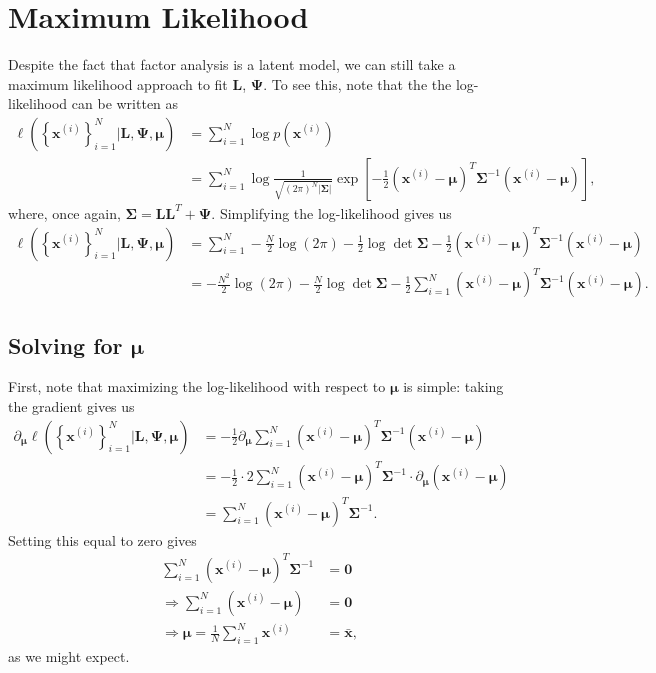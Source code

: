\documentclass[12pt]{article}
\begin{document}
\section{Maximum Likelihood}
Despite the fact that factor analysis is a latent model, we can still take a maximum likelihood approach to fit $\mathbf{L}$, $\boldsymbol{\Psi}$. To see this, note that the the log-likelihood can be written as 
\begin{align}
	\ell \left(\left\{\mathbf{x}^{(i)}\right\}_{i=1}^N|\mathbf{L}, \boldsymbol{\Psi}, \boldsymbol{\mu}\right) &= \sum_{i=1}^N \log p(\mathbf{x}^{(i)}) \\
	&= \sum_{i=1}^N \log \frac{1}{\sqrt{(2\pi)^N |\boldsymbol{\Sigma}|}} \exp\left[-\frac{1}{2} (\mathbf{x}^{(i)} - \boldsymbol{\mu})^T \boldsymbol{\Sigma}^{-1}\left(\mathbf{x}^{(i)} - \boldsymbol{\mu}\right)\right],
\end{align}
where, once again, $\boldsymbol{\Sigma}=\mathbf{LL}^T + \boldsymbol{\Psi}$. Simplifying the log-likelihood gives us
\begin{align}
\ell \left(\left\{\mathbf{x}^{(i)}\right\}_{i=1}^N|\mathbf{L}, \boldsymbol{\Psi}, \boldsymbol{\mu}\right) &= \sum_{i=1}^N -\frac{N}{2}\log(2\pi) -\frac{1}{2} \log\det \boldsymbol{\Sigma} - \frac{1}{2}(\mathbf{x}^{(i)} - \boldsymbol{\mu})^T \boldsymbol{\Sigma}^{-1}\left(\mathbf{x}^{(i)} - \boldsymbol{\mu}\right) \\
&= -\frac{N^2}{2} \log(2\pi) - \frac{N}{2} \log\det\boldsymbol{\Sigma} - \frac{1}{2}\sum_{i=1}^N(\mathbf{x}^{(i)} - \boldsymbol{\mu})^T \boldsymbol{\Sigma}^{-1}\left(\mathbf{x}^{(i)} - \boldsymbol{\mu}\right).
\end{align}
\subsection{Solving for $\boldsymbol{\mu}$}
First, note that maximizing the log-likelihood with respect to $\boldsymbol{\mu}$ is simple: taking the gradient gives us
\begin{align}
\partial_{\boldsymbol{\mu}} \ell \left(\left\{\mathbf{x}^{(i)}\right\}_{i=1}^N|\mathbf{L}, \boldsymbol{\Psi}, \boldsymbol{\mu}\right) &= -\frac{1}{2}\partial_{\boldsymbol{\mu}}  \sum_{i=1}^N(\mathbf{x}^{(i)} - \boldsymbol{\mu})^T \boldsymbol{\Sigma}^{-1}\left(\mathbf{x}^{(i)} - \boldsymbol{\mu}\right) \\
&= -\frac{1}{2} \cdot 2 \sum_{i=1}^N (\mathbf{x}^{(i)} - \boldsymbol{\mu})^T \boldsymbol{\Sigma}^{-1} \cdot \partial_{\boldsymbol{\mu}} (\mathbf{x}^{(i)} - \boldsymbol{\mu}) \\
&= \sum_{i=1}^N (\mathbf{x}^{(i)} - \boldsymbol{\mu})^T \boldsymbol{\Sigma}^{-1}.
\end{align}
Setting this equal to zero gives 
\begin{align}
\sum_{i=1}^N (\mathbf{x}^{(i)} - \boldsymbol{\mu})^T \boldsymbol{\Sigma}^{-1} &= \mathbf{0} \\
\Rightarrow \sum_{i=1}^N (\mathbf{x}^{(i)} - \boldsymbol{\mu}) &= \mathbf{0} \\
\Rightarrow \boldsymbol{\mu} = \frac{1}{N} \sum_{i=1}^N  \mathbf{x}^{(i)} &= \bar{\mathbf{x}},
\end{align}
as we might expect.
\end{document}
